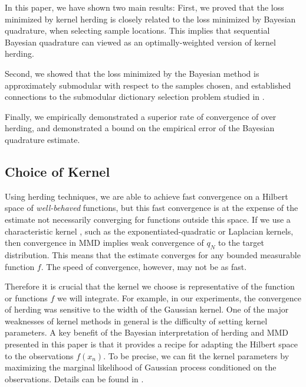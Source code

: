 In this paper, we have shown two main results:  First, we proved that the loss minimized by kernel herding is closely related to the loss minimized by Bayesian quadrature, when selecting sample locations. This implies that sequential Bayesian quadrature can viewed as an optimally-weighted version of kernel herding.

Second, we showed that the loss minimized by the Bayesian method is approximately submodular with respect to the samples chosen, and established connections to the submodular dictionary selection problem studied in \citep{KrauseCevher10}.

Finally, we empirically demonstrated a superior rate of convergence of \sbq{} over herding, and demonstrated a bound on the empirical error of the Bayesian quadrature estimate.

\subsection{Choice of Kernel}

Using herding techniques, we are able to achieve fast convergence on a Hilbert space of \emph{well-behaved} functions, but this fast convergence is at the expense of the estimate not necessarily converging for functions outside this space.
If we use a characteristic kernel \citep{Sriperumbudur2008}, such as the exponentiated-quadratic or Laplacian kernels, then convergence in MMD implies weak convergence of $q_N$ to the target distribution. 
This means that the estimate converges for any bounded measurable function $f$. The speed of convergence, however, may not be as fast.

Therefore it is crucial that the kernel we choose is representative of the function or functions $f$ we will integrate. For example, in our experiments, the convergence of herding was sensitive to the width of the Gaussian kernel. One of the major weaknesses of kernel methods in general is the difficulty of setting kernel parameters. A key benefit of the Bayesian interpretation of herding and MMD presented in this paper is that it provides a recipe for adapting the Hilbert space to the observations $f(x_n)$. To be precise, we can fit the kernel parameters by maximizing the marginal likelihood of Gaussian process conditioned on the observations. Details can be found in \citep{Rasmussen2006}.

